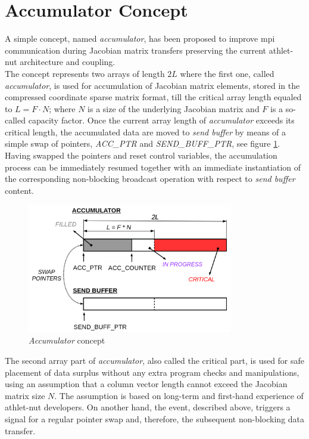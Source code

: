\section{Accumulator Concept}
\label{sec:accumulator-approach}



A simple concept, named \textit{accumulator}, has been proposed to improve \acrshort{mpi} communication during Jacobian matrix transfers preserving the current \acrshort{athlet}-\acrshort{nut} architecture and coupling.\\


The concept represents two arrays of length $2L$ where the first one, called \textit{accumulator}, is used for accumulation of Jacobian matrix elements, stored in the compressed coordinate sparse matrix format, till the critical array length equaled to $L = F \cdot N$; where $N$ is a size of the underlying Jacobian matrix and $F$ is a so-called capacity factor. Once the current array length of \textit{accumulator} exceeds its critical length, the accumulated data are moved to \textit{send buffer} by means of a simple swap of pointers, \textit{ACC\_PTR} and \textit{SEND\_BUFF\_PTR}, see figure \ref{fig:accumulator-concept}. Having swapped the pointers and reset control variables, the accumulation process can be immediately resumed together with an immediate instantiation of the corresponding non-blocking broadcast operation with respect to \textit{send buffer} content.\\


\begin{figure}[htpb]
  \centering
  \includegraphics[width=0.8\textwidth]{figures/chapter-3/accumulator-concept.png}
  \caption{\textit{Accumulator} concept} \label{fig:accumulator-concept}
\end{figure}


The second array part of \textit{accumulator}, also called the critical part, is used for safe placement of data surplus without any extra program checks and manipulations, using an assumption that a column vector length cannot exceed the Jacobian matrix size $N$. The assumption is based on long-term and first-hand experience of \acrshort{athlet}-\acrshort{nut} developers. On another hand, the event, described above, triggers a signal for a regular pointer swap and, therefore, the subsequent non-blocking data transfer.\\


